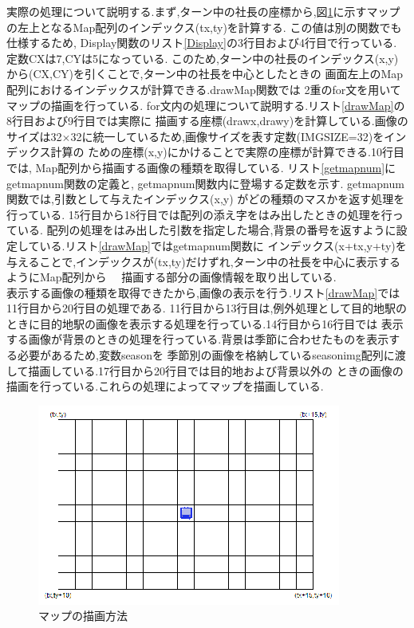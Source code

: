 \documentclass[a4j]{jarticle}
\begin{document}
        実際の処理について説明する.まず,ターン中の社長の座標から,図\ref{mapdesc}に示すマップの左上となるMap配列のインデックス(tx,ty)を計算する.
        この値は別の関数でも仕様するため, Display関数のリスト\ref{Display}の3行目および4行目で行っている. 定数CXは7,CYは5になっている.
        このため,ターン中の社長のインデックス(x,y)から(CX,CY)を引くことで,ターン中の社長を中心としたときの
        画面左上のMap配列におけるインデックスが計算できる.drawMap関数では
        2重のfor文を用いてマップの描画を行っている. for文内の処理について説明する.リスト\ref{drawMap}の8行目および9行目では実際に
        描画する座標(drawx,drawy)を計算している.画像のサイズは32$\times$32に統一しているため,画像サイズを表す定数(IMGSIZE=32)をインデックス計算の
        ための座標(x,y)にかけることで実際の座標が計算できる.10行目では, Map配列から描画する画像の種類を取得している. リスト\ref{getmapnum}に
        getmapnum関数の定義と, getmapnum関数内に登場する定数を示す. getmapnum関数では,引数として与えたインデックス(x,y)
        がどの種類のマスかを返す処理を行っている. 15行目から18行目では配列の添え字をはみ出したときの処理を行っている.
        配列の処理をはみ出した引数を指定した場合,背景の番号を返すように設定している.リスト\ref{drawMap}ではgetmapnum関数に
        インデックス(x+tx,y+ty)を与えることで,インデックスが(tx,ty)だけずれ,ターン中の社長を中心に表示するようにMap配列から
        　描画する部分の画像情報を取り出している.\\
        表示する画像の種類を取得できたから,画像の表示を行う.リスト\ref{drawMap}では11行目から20行目の処理である.
        11行目から13行目は,例外処理として目的地駅のときに目的地駅の画像を表示する処理を行っている.14行目から16行目では
        表示する画像が背景のときの処理を行っている.背景は季節に合わせたものを表示する必要があるため,変数seasonを
        季節別の画像を格納しているseasonimg配列に渡して描画している.17行目から20行目では目的地および背景以外の
        ときの画像の描画を行っている.これらの処理によってマップを描画している.

        \begin{figure}[H]
            \centering
            \includegraphics[scale=2.7]{mapdesc.eps}
            \caption{マップの描画方法}
             \label{mapdesc}
            \end{figure} 
\end{document}
